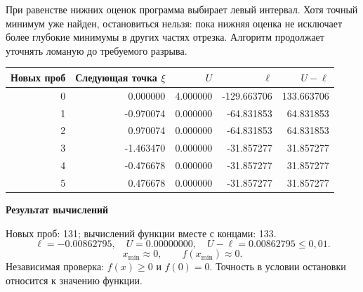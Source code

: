 \documentclass[12pt,a4paper]{article}
\begin{document}
При равенстве нижних оценок программа выбирает левый интервал.
Хотя точный минимум уже найден, остановиться нельзя: пока нижняя оценка
не исключает более глубокие минимумы в других частях отрезка.
Алгоритм продолжает уточнять ломаную до требуемого разрыва.
\begin{center}\small
\begin{tabular}{r|r|r|r|r}
Новых проб & Следующая точка $\xi$ & $U$ & $\ell$ & $U-\ell$\\\hline
0 & 0.000000 & 4.000000 & -129.663706 & 133.663706\\
1 & -0.970074 & 0.000000 & -64.831853 & 64.831853\\
2 & 0.970074 & 0.000000 & -64.831853 & 64.831853\\
3 & -1.463470 & 0.000000 & -31.857277 & 31.857277\\
4 & -0.476678 & 0.000000 & -31.857277 & 31.857277\\
5 & 0.476678 & 0.000000 & -31.857277 & 31.857277\\
\end{tabular}\end{center}
\par\textbf{Результат вычислений}\par
Новых проб: 131; вычислений функции вместе с концами: 133.
\[\ell=-0.00862795,\quad U=0.00000000,\quad U-\ell=0.00862795\le0{,}01.\]
\[
\boxed{x_{\min}\approx0,\qquad f(x_{\min})\approx0.}
\]
Независимая проверка: $f(x)\ge0$ и $f(0)=0$.
Точность в условии остановки относится к значению функции.
\end{document}
